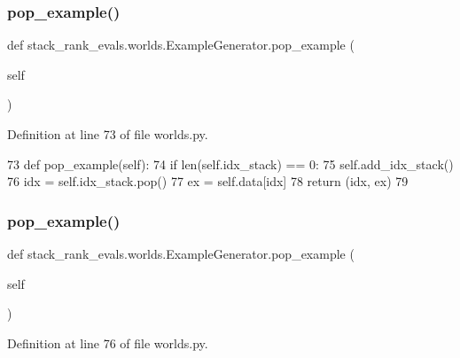 \subsubsection{\texorpdfstring{pop\+\_\+example()}{pop\_example()}\hspace{0.1cm}{\footnotesize\ttfamily [1/2]}}
{\footnotesize\ttfamily def stack\+\_\+rank\+\_\+evals.\+worlds.\+Example\+Generator.\+pop\+\_\+example (\begin{DoxyParamCaption}\item[{}]{self }\end{DoxyParamCaption})}



Definition at line 73 of file worlds.\+py.


\begin{DoxyCode}
73     \textcolor{keyword}{def }pop\_example(self):
74         \textcolor{keywordflow}{if} len(self.idx\_stack) == 0:
75             self.add\_idx\_stack()
76         idx = self.idx\_stack.pop()
77         ex = self.data[idx]
78         \textcolor{keywordflow}{return} (idx, ex)
79 
\end{DoxyCode}
\mbox{\label{classstack__rank__evals_1_1worlds_1_1ExampleGenerator_ae50d35087dd679c73aa8f5354845199f}} 
\subsubsection{\texorpdfstring{pop\+\_\+example()}{pop\_example()}\hspace{0.1cm}{\footnotesize\ttfamily [2/2]}}
{\footnotesize\ttfamily def stack\+\_\+rank\+\_\+evals.\+worlds.\+Example\+Generator.\+pop\+\_\+example (\begin{DoxyParamCaption}\item[{}]{self }\end{DoxyParamCaption})}



Definition at line 76 of file worlds.\+py.


